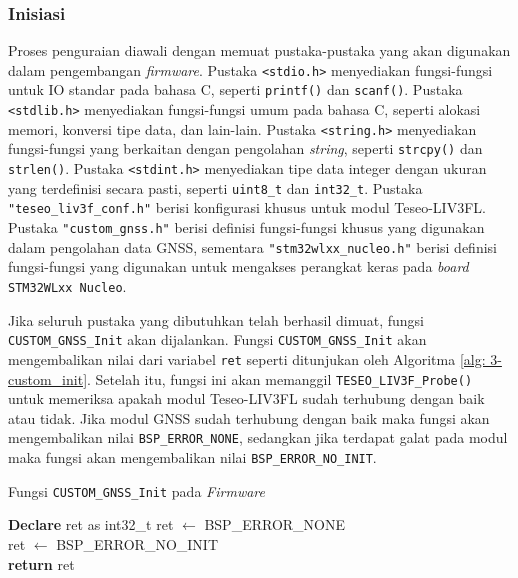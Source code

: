 \subsubsection{Inisiasi}
Proses penguraian diawali dengan memuat pustaka-pustaka yang akan digunakan dalam pengembangan \textit{firmware}. Pustaka \texttt{<stdio.h>} menyediakan fungsi-fungsi untuk IO standar pada bahasa C, seperti \texttt{printf()} dan \texttt{scanf()}. Pustaka \texttt{<stdlib.h>} menyediakan fungsi-fungsi umum pada bahasa C, seperti alokasi memori, konversi tipe data, dan lain-lain. Pustaka \texttt{<string.h>} menyediakan fungsi-fungsi yang berkaitan dengan pengolahan \textit{string}, seperti \texttt{strcpy()} dan \texttt{strlen()}. Pustaka \texttt{<stdint.h>} menyediakan tipe data integer dengan ukuran yang terdefinisi secara pasti, seperti \texttt{uint8\_t} dan \texttt{int32\_t}. Pustaka \texttt{"teseo\_liv3f\_conf.h"} berisi konfigurasi khusus untuk modul Teseo\hyp{}LIV3FL. Pustaka \texttt{"custom\_gnss.h"} berisi definisi fungsi-fungsi khusus yang digunakan dalam pengolahan data GNSS, sementara \texttt{"stm32wlxx\_nucleo.h"} berisi definisi fungsi-fungsi yang digunakan untuk mengakses perangkat keras pada \textit{board} \texttt{STM32WLxx Nucleo}.

Jika seluruh pustaka yang dibutuhkan telah berhasil dimuat, fungsi \texttt{CUSTOM\_GNSS\_Init} akan dijalankan. Fungsi \texttt{CUSTOM\_GNSS\_Init} akan mengembalikan nilai dari variabel \texttt{ret} seperti ditunjukan oleh Algoritma \ref{alg: 3-custom_init}. Setelah itu, fungsi ini akan memanggil \texttt{TESEO\_LIV3F\_Probe()} untuk memeriksa apakah modul Teseo\hyp{}LIV3FL sudah terhubung dengan baik atau tidak. Jika modul GNSS sudah terhubung dengan baik maka fungsi akan mengembalikan nilai \texttt{BSP\_ERROR\_NONE}, sedangkan jika terdapat galat pada modul maka fungsi akan mengembalikan nilai \texttt{BSP\_ERROR\_NO\_INIT}.

\begin{algorithm}
	\caption{Fungsi \texttt{CUSTOM\_GNSS\_Init} pada \textit{Firmware}}
	\label{alg: 3-custom_init}
	\begin{algorithmic}[1]
		\State \textbf{Declare} ret as int32\_t
		\State ret $\gets$ BSP\_ERROR\_NONE
		\\
			\State ret $\gets$ BSP\_ERROR\_NO\_INIT
		\EndIf
		\\
		\State \textbf{return} ret
	\EndFunction
	\end{algorithmic}
\end{algorithm}

